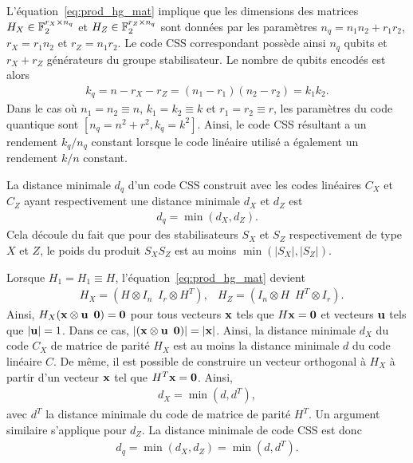 L'équation~\eqref{eq:prod_hg_mat} implique que les dimensions des matrices
$H_X \in \mathbb{F}_{2}^{r_X \times n_q}$ et $H_Z \in \mathbb{F}_{2}^{r_Z \times n_q}$ 
sont données par les paramètres $n_q = n_1 n_2 + r_1 r_2$, $r_X = r_1 n_2$ et $r_Z = n_1 r_2$.
Le code CSS correspondant possède ainsi $n_q$ qubits et $r_X + r_Z$ générateurs du groupe stabilisateur.
Le nombre de qubits encodés est alors
\begin{align}
	k_q 
	= 
	n - r_X - r_Z
	= (n_1 - r_1)(n_2 - r_2)
	= k_1 k_2.
\end{align}
Dans le cas où $n_1 = n_2 \equiv n$, $k_1 = k_2 \equiv k$ et $r_1 = r_2 \equiv r$,
les paramètres du code quantique sont $[n_q = n^2 + r^2, k_q = k^2]$.
Ainsi,
le code CSS résultant a un rendement $k_q / n_q$ constant lorsque le code linéaire utilisé 
a également un rendement $k/n$ constant.

La distance minimale $d_q$ d'un code CSS construit avec les codes linéaires $C_X$ et $C_Z$ 
ayant respectivement une distance minimale $d_X$ et $d_Z$ est~\cite{calderbank_good_1996}
\begin{align}
	d_q = \min(d_X, d_Z).
\end{align}
Cela découle du fait que pour des stabilisateurs $S_X$ et $S_Z$ respectivement de type $X$ et $Z$,
le poids du produit $S_X S_Z$ est au moins $\min(|S_X|, |S_Z|)$.

Lorsque $H_1 = H_1 \equiv H$,
l'équation~\eqref{eq:prod_hg_mat} devient
\begin{align}
	&H_X = (H \otimes I_{n}\, \, \, I_{r} \otimes H^T),
	&H_Z = (I_{n} \otimes H \, \, \, H^T \otimes I_{r}).
\end{align}
Ainsi,
$H_X(\vb x \otimes \vb u \, \, \, \vb 0) = \vb 0$ 
pour tous vecteurs $\vb x$ tels que $H \vb x = \vb 0$ et vecteurs $\vb u$ 
tels que $|\vb u| = 1$.
Dans ce cas,
$|(\vb x \otimes \vb u \, \, \, \vb 0)| = |\vb x|$.
Ainsi,
la distance minimale $d_X$ du code $C_X$ de matrice de parité $H_X$ est au moins la distance
minimale $d$ du code linéaire $C$.
De même,
il est possible de construire un vecteur orthogonal à $H_X$ à partir d'un vecteur $\vb x$
tel que $H^T \vb x = \vb 0$.
Ainsi,
\begin{align}
	d_X = \min(d, d^T),
\end{align}
avec $d^T$ la distance minimale du code de matrice de parité $H^T$.
Un argument similaire s'applique pour $d_Z$.
La distance minimale de code CSS est donc~\cite{tillich_quantum_2014}
\begin{align}
	d_q = \min(d_X, d_Z) = \min(d, d^T).
\end{align}

